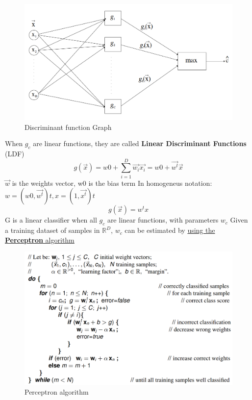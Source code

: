 \begin{figure}[htbp]
   \centering
   \includegraphics{images/08/discriminant.png}
   \caption{Discriminant function Graph}
   \label{fig:08/discriminant}
\end{figure}

When $g_c$ are linear functions, they are called \textbf{Linear Discriminant Functions} (\textsc{LDF})
\[
   g(\vec{x}) = w0 + \sum^D_{i=1}\vec{w_i} \vec{x_i} = w0 + \vec{w^t} \vec{x}
   \]
$\vec{w}$ is the weights vector, w0 is the bias term
In homogeneus notation: $w = (w0, \vec{w^t} )t , x = (1, \vec{x^t} )t$
\[g(\vec{x}) = w^t x\]
G is a linear classifier when all $g_c$ are linear functions, with parameters $w_c$
Given a training dataset of samples in $\mathbb{R}^D$, $w_c$ can be estimated by \ul{using the
\textbf{Perceptron} algorithm}

\begin{figure}[htbp]
   \centering
   \includegraphics{images/08/perceptron.png}
   \caption{Perceptron algorithm}
   \label{fig:08/perceptron}
\end{figure}

